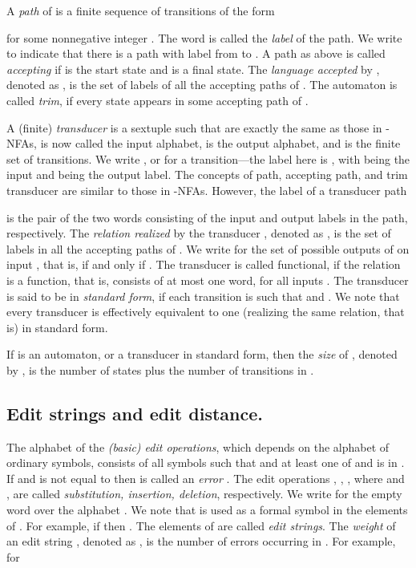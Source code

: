 \documentclass{article}
\theoremstyle{plain}
\theoremstyle{definition}
\theoremstyle{remark}
\begin{document}
\par
A \emph{path} of  is a finite sequence of transitions of the form
 
for some nonnegative integer . The word  is called the \emph{label} of the path.
We write  to
indicate that there is a path with label  from  to
.
A path
as above is called \emph{accepting} if
 is the start state and  is a final state. The \emph{language accepted} by , denoted as , is the set of labels of all the accepting paths of . The automaton  is called
\emph{trim}, if every state appears in some accepting path of .
\par
A (finite) \emph{transducer} \cite{Be:1979,Yu:handbook} is a sextuple  such that  are exactly the same as those in -NFAs,  is now called the input alphabet,  is the output alphabet, and  is the finite set of transitions. We write ,
or  for a transition---the label here is , with  being the input and  being the output label. The concepts of path, accepting path, and trim transducer are similar to those in -NFAs. However, the label of a
transducer path

is the pair  of the two words consisting of the input and output labels in the path, respectively. The \emph{relation realized}
by the transducer , denoted as , is the set of labels in all the accepting paths of .
We write  for the set of possible outputs of  on input , that is,   if and only if .
The transducer is called functional, if
the relation  is a function, that is,
 consists of at most one word, for all inputs .
The transducer  is said to be in \emph{standard form}, if each transition  is such that  and .
We note that every transducer is effectively equivalent to one (realizing the same relation, that is) in standard form.
\par
If  is an automaton, or a transducer in standard form, then the \emph{size} of
, denoted by , is the number of states plus the number
of transitions in .

\subsection{Edit strings and edit distance.}
The alphabet  of the
\emph{(basic) edit operations}, which depends on the alphabet 
of ordinary symbols, consists of all
symbols  such that  and at least one
of  and  is in . If  and  is
not equal to  then  is called an \emph{error} \cite{KaKo:2004}.
The edit operations , , ,
where  and ,
are called \emph{substitution, insertion, deletion}, respectively.
We write  for the empty word over the alphabet . We
note that  is used as a formal symbol in the elements of
. For example, if  then
.
The elements of  are
called \emph{edit strings}.
The {\it weight\/} of an edit string , denoted as ,  is the number
of errors occurring in . For example, for
\end{document}
